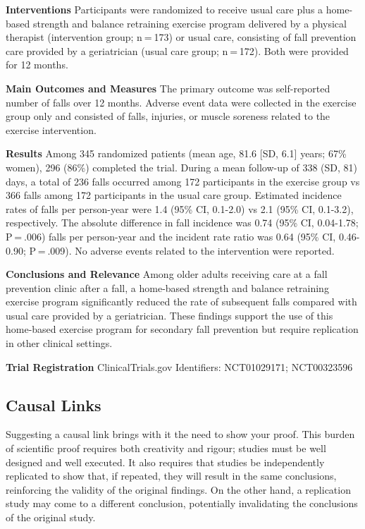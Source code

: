\documentclass[
]{book}
\begin{document}
\textbf{Interventions} Participants were randomized to receive usual care plus a home-based strength and balance retraining exercise program delivered by a physical therapist (intervention group; n = 173) or usual care, consisting of fall prevention care provided by a geriatrician (usual care group; n = 172). Both were provided for 12 months.

\textbf{Main Outcomes and Measures} The primary outcome was self-reported number of falls over 12 months. Adverse event data were collected in the exercise group only and consisted of falls, injuries, or muscle soreness related to the exercise intervention.

\textbf{Results} Among 345 randomized patients (mean age, 81.6 {[}SD, 6.1{]} years; 67\% women), 296 (86\%) completed the trial. During a mean follow-up of 338 (SD, 81) days, a total of 236 falls occurred among 172 participants in the exercise group vs 366 falls among 172 participants in the usual care group. Estimated incidence rates of falls per person-year were 1.4 (95\% CI, 0.1-2.0) vs 2.1 (95\% CI, 0.1-3.2), respectively. The absolute difference in fall incidence was 0.74 (95\% CI, 0.04-1.78; P = .006) falls per person-year and the incident rate ratio was 0.64 (95\% CI, 0.46-0.90; P = .009). No adverse events related to the intervention were reported.

\textbf{Conclusions and Relevance} Among older adults receiving care at a fall prevention clinic after a fall, a home-based strength and balance retraining exercise program significantly reduced the rate of subsequent falls compared with usual care provided by a geriatrician. These findings support the use of this home-based exercise program for secondary fall prevention but require replication in other clinical settings.

\textbf{Trial Registration} ClinicalTrials.gov Identifiers: NCT01029171; NCT00323596

\hypertarget{causal-links}{%
\subsection*{Causal Links}\label{causal-links}}

Suggesting a causal link brings with it the need to show your proof. This burden of scientific proof requires both creativity and rigour; studies must be well designed and well executed. It also requires that studies be independently replicated to show that, if repeated, they will result in the same conclusions, reinforcing the validity of the original findings. On the other hand, a replication study may come to a different conclusion, potentially invalidating the conclusions of the original study.
\end{document}
